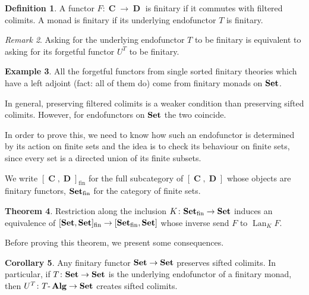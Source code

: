 \documentclass[a4paper,11pt,twoside, openany]{book}
\newcommand{\catname}[1]{{\normalfont\textbf{#1}}}
\DeclareMathOperator{\Alg}{\mathbf{Alg}}
\newcommand{\Set}{\catname{Set}}
\DeclareMathOperator{\C}{\mathbf{C}}
\DeclareMathOperator{\D}{\mathbf{D}}
\DeclareMathOperator{\Lan}{Lan}
\theoremstyle{definition}
\newtheorem{thm}{Theorem}[section] %
\theoremstyle{definition}
\newtheorem{defn}[thm]{Definition} %
\newtheorem{exmp}[thm]{Example} %
\newtheorem{cor}[thm]{Corollary}
\theoremstyle{remark}
\newtheorem{rmk}[thm]{Remark}
\begin{document}
	\begin{defn}
		A functor $F\colon\C\rightarrow\D$ is finitary if it commutes with filtered colimits. A monad is finitary if its underlying endofunctor $T$ is finitary.
	\end{defn}
	
	\begin{rmk}
		Asking for the underlying endofunctor $T$ to be finitary is equivalent to asking for its forgetful functor $U^T$ to be finitary.
	\end{rmk}
	
	\begin{exmp}
		All the forgetful functors from single sorted finitary theories which have a left adjoint (fact: all of them do) come from finitary monads on $\Set$.
	\end{exmp}
	
	In general, preserving filtered colimits is a weaker condition than preserving sifted colimits. However, for endofunctors on $\Set$ the two coincide.
	
	In order to prove this, we need to know how such an endofunctor is determined by its action on finite sets and the idea is to check its behaviour on finite sets, since every set is a directed union of its finite subsets.
	
	We write $[\C,\D]_\text{fin}$ for the full subcategory of $[\C,\D]$ whose objects are finitary functors, $\Set_\text{fin}$ for the category of finite sets.
	
	\begin{thm}
		Restriction along the inclusion $K\colon\Set_\text{fin}\rightarrow\Set$ induces an equivalence of $[\Set,\Set]_\text{fin}\rightarrow[\Set_\text{fin},\Set]$ whose inverse send $F$ to $\Lan_KF$.
	\end{thm}
	
	Before proving this theorem, we present some consequences.
	
	\begin{cor}
		Any finitary functor $\Set\rightarrow\Set$ preserves sifted colimits. In particular, if $T\colon\Set\rightarrow\Set$ is the underlying endofunctor of a finitary monad, then $U^T\colon T\mbox{-}\Alg\rightarrow\Set$ creates sifted colimits.
	\end{cor}
	
\end{document}
